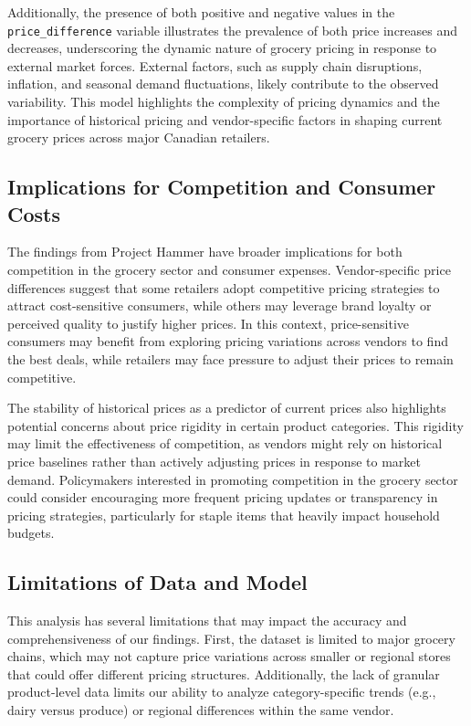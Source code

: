 \documentclass[
  letterpaper,
  DIV=11,
  numbers=noendperiod]{scrartcl}
\begin{document}
Additionally, the presence of both positive and negative values in the
\texttt{price\_difference} variable illustrates the prevalence of both
price increases and decreases, underscoring the dynamic nature of
grocery pricing in response to external market forces. External factors,
such as supply chain disruptions, inflation, and seasonal demand
fluctuations, likely contribute to the observed variability. This model
highlights the complexity of pricing dynamics and the importance of
historical pricing and vendor-specific factors in shaping current
grocery prices across major Canadian retailers.

\subsection{Implications for Competition and Consumer
Costs}\label{implications-for-competition-and-consumer-costs}

The findings from Project Hammer have broader implications for both
competition in the grocery sector and consumer expenses. Vendor-specific
price differences suggest that some retailers adopt competitive pricing
strategies to attract cost-sensitive consumers, while others may
leverage brand loyalty or perceived quality to justify higher prices. In
this context, price-sensitive consumers may benefit from exploring
pricing variations across vendors to find the best deals, while
retailers may face pressure to adjust their prices to remain
competitive.

The stability of historical prices as a predictor of current prices also
highlights potential concerns about price rigidity in certain product
categories. This rigidity may limit the effectiveness of competition, as
vendors might rely on historical price baselines rather than actively
adjusting prices in response to market demand. Policymakers interested
in promoting competition in the grocery sector could consider
encouraging more frequent pricing updates or transparency in pricing
strategies, particularly for staple items that heavily impact household
budgets.

\subsection{Limitations of Data and
Model}\label{limitations-of-data-and-model}

This analysis has several limitations that may impact the accuracy and
comprehensiveness of our findings. First, the dataset is limited to
major grocery chains, which may not capture price variations across
smaller or regional stores that could offer different pricing
structures. Additionally, the lack of granular product-level data limits
our ability to analyze category-specific trends (e.g., dairy versus
produce) or regional differences within the same vendor.
\end{document}
